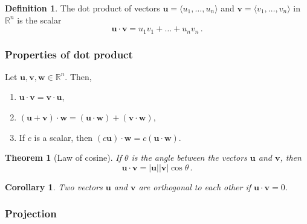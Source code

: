 \documentclass[
]{article}
\newtheorem{theorem}{Theorem}[section]
\newtheorem{corollary}{Corollary}[section]
\theoremstyle{definition}
\newtheorem{definition}{Definition}[section]
\theoremstyle{definition}
\theoremstyle{definition}
\theoremstyle{definition}
\theoremstyle{remark}
\begin{document}
\begin{definition}
The dot product of vectors \(\textbf{u} = \langle u_1, \dots, u_n \rangle\)
and \(\textbf{v} = \langle v_1, \dots, v_n \rangle\) in \(\mathbb{R}^n\) is the
scalar
\begin{equation*}
    \textbf{u} \cdot \textbf{v} = u_1 v_1 +\dots + u_n v_n \,.
\end{equation*}
\end{definition}

\hypertarget{properties-of-dot-product}{%
\subsubsection*{Properties of dot product}\label{properties-of-dot-product}}

Let \(\textbf{u}, \textbf{v}, \textbf{w} \in \mathbb{R}^n\). Then,

\begin{enumerate}
\def\labelenumi{\arabic{enumi}.}
\item
  \(\textbf{u}\cdot \textbf{v} = \textbf{v}\cdot \textbf{u}\),
\item
  \((\textbf{u} + \textbf{v})\cdot \textbf{w} = (\textbf{u}\cdot \textbf{w}) + (\textbf{v}\cdot \textbf{w})\),
\item
  If \(c\) is a scalar, then \((c \textbf{u})\cdot \textbf{w} = c (\textbf{u}\cdot \textbf{w})\).
\end{enumerate}

\begin{theorem}[Law of cosine]
If \(\theta\) is the angle between the vectors \(\textbf{u}\) and \(\textbf{v}\), then
\begin{equation*}
        \textbf{u}\cdot \textbf{v} = |\textbf{u}|| \textbf{v}| \cos \theta \,.
   \end{equation*}
\end{theorem}

\begin{corollary}
Two vectors \(\textbf{u}\) and \(\textbf{v}\) are orthogonal to each other
if \(\textbf{u} \cdot \textbf{v} = 0\).
\end{corollary}

\hypertarget{projection}{%
\subsubsection*{Projection}\label{projection}}
\end{document}
